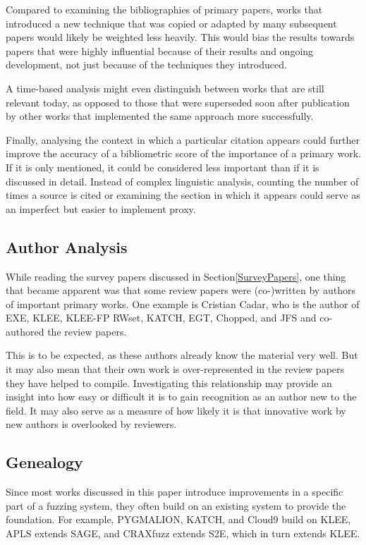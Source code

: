 \documentclass{article}
\begin{document}
\begin{multicols}{2}
    Compared to examining the bibliographies of primary papers, works that introduced a new technique that was copied or adapted by many subsequent papers would likely be weighted less heavily. This would bias the results towards papers that were highly influential because of their results and ongoing development, not just because of the techniques they introduced.

    A time-based analysis might even distinguish between works that are still relevant today, as opposed to those that were superseded soon after publication by other works that implemented the same approach more successfully.

    Finally, analysing the context in which a particular citation appears could further improve the accuracy of a bibliometric score of the importance of a primary work. If it is only mentioned, it could be considered less important than if it is discussed in detail. Instead of complex linguistic analysis, counting the number of times a source is cited or examining the section in which it appears could serve as an imperfect but easier to implement proxy.

    \subsection{Author Analysis}
    While reading the survey papers discussed in Section\ref{SurveyPapers}, one thing that became apparent was that some review papers were (co-)written by authors of important primary works. One example is Cristian Cadar, who is the author of EXE\cite{EXE}, KLEE\cite{KLEE}, KLEE-FP\cite{KLEEFP} RWset\cite{RWset}, KATCH\cite{KATCH}, EGT\cite{EGT}, Chopped\cite{Chopped}, and JFS\cite{JFS} and co-authored the review papers\cite{ReviewThreeDecades, ChallengesAndReflections, PreliminaryAssessment}.

    This is to be expected, as these authors already know the material very well. But it may also mean that their own work is over-represented in the review papers they have helped to compile. Investigating this relationship may provide an insight into how easy or difficult it is to gain recognition as an author new to the field. It may also serve as a measure of how likely it is that innovative work by new authors is overlooked by reviewers.

    \subsection{Genealogy}
    Since most works discussed in this paper introduce improvements in a specific part of a fuzzing system, they often build on an existing system to provide the foundation. For example, PYGMALION\cite{PYGMALION}, KATCH\cite{KATCH}, and Cloud9\cite{Cloud9} build on KLEE\cite{KLEE}, APLS\cite{APLS} extends SAGE\cite{SAGE}, and CRAXfuzz\cite{CRAXfuzz} extends S2E\cite{S2E}, which in turn extends KLEE\cite{KLEE}.


\end{multicols}
\end{document}
